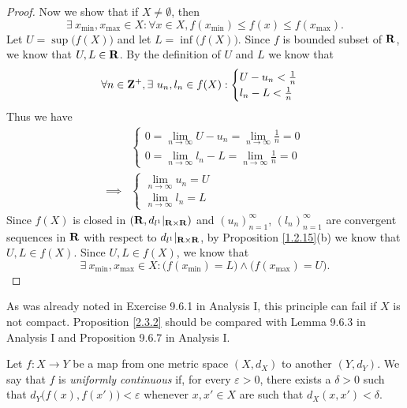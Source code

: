\begin{proof}
    Now we show that if \(X \neq \emptyset\), then
    \[
        \exists\ x_{\min}, x_{\max} \in X : \forall x \in X, f(x_{\min}) \leq f(x) \leq f(x_{\max}).
    \]
    Let \(U = \sup\big(f(X)\big)\) and let \(L = \inf\big(f(X)\big)\).
    Since \(f\) is bounded subset of \(\mathbf{R}\), we know that \(U, L \in \mathbf{R}\).
    By the definition of \(U\) and \(L\) we know that
    \[
        \forall n \in \Z^+, \exists\ u_n, l_n \in f(X) : \begin{cases}
            U - u_n < \frac{1}{n} \\
            l_n - L < \frac{1}{n}
        \end{cases}
    \]
    Thus we have
    \begin{align*}
                 & \begin{cases}
                       0 = \lim_{n \to \infty} U - u_n = \lim_{n \to \infty} \frac{1}{n} = 0 \\
                       0 = \lim_{n \to \infty} l_n - L = \lim_{n \to \infty} \frac{1}{n} = 0
                   \end{cases} \\
        \implies & \begin{cases}
                       \lim_{n \to \infty} u_n = U \\
                       \lim_{n \to \infty} l_n = L
                   \end{cases}
    \end{align*}
    Since \(f(X)\) is closed in \((\mathbf{R}, d_{l^1}|_{\mathbf{R} \times \mathbf{R}})\) and \((u_n)_{n = 1}^\infty\), \((l_n)_{n = 1}^\infty\) are convergent sequences in \(\mathbf{R}\) with respect to \(d_{l^1}|_{\mathbf{R} \times \mathbf{R}}\), by Proposition \ref{1.2.15}(b) we know that \(U, L \in f(X)\).
    Since \(U, L \in f(X)\), we know that
    \[
        \exists\ x_{\min}, x_{\max} \in X : \big(f(x_{\min}) = L\big) \land \big(f(x_{\max}) = U\big).
    \]
\end{proof}

\begin{remark}\label{2.3.3}
    As was already noted in Exercise 9.6.1 in Analysis I, this principle can fail if \(X\) is not compact.
    Proposition \ref{2.3.2} should be compared with Lemma 9.6.3 in Analysis I and Proposition 9.6.7 in Analysis I.
\end{remark}

\begin{definition}\label{2.3.4}
    Let \(f : X \to Y\) be a map from one metric space \((X, d_X)\) to another \((Y, d_Y)\).
    We say that \(f\) is \emph{uniformly continuous} if, for every \(\varepsilon > 0\), there exists a \(\delta > 0\) such that \(d_Y\big(f(x), f(x')\big) < \varepsilon\) whenever \(x, x' \in X\) are such that \(d_X(x, x') < \delta\).
\end{definition}

